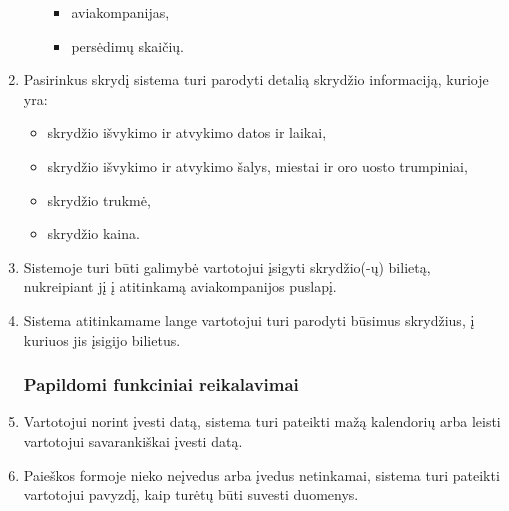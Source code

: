 \documentclass{VUMIFPSkursinis}
\begin{document}
\begin{enumerate}[label=\textbf{FR\arabic*}.]
\begin{enumerate}[label*=\textbf{\arabic*}.]
                        	\begin{itemize}
                            	\item aviakompanijas,
                            	\item persėdimų skaičių.
                        	\end{itemize}
                    	\end{enumerate}
                    	\item \label{skrydzio_info} Pasirinkus skrydį sistema turi parodyti detalią skrydžio informaciją, kurioje yra:
                    	\begin{itemize}
                    		\item skrydžio išvykimo ir atvykimo datos ir laikai,
                    		\item skrydžio išvykimo ir atvykimo šalys, miestai ir oro uosto trumpiniai,
							\item skrydžio trukmė,
							\item skrydžio kaina.
                    	\end{itemize}
                    	\item Sistemoje turi būti galimybė vartotojui įsigyti skrydžio(-ų) bilietą, nukreipiant jį į atitinkamą aviakompanijos puslapį.
                    	\item Sistema atitinkamame lange vartotojui turi parodyti būsimus skrydžius, į kuriuos jis įsigijo bilietus.
                	\subsubsection{Papildomi funkciniai reikalavimai}
                    	\item \label{datos_ivedimas} Vartotojui norint įvesti datą, sistema turi pateikti mažą kalendorių arba leisti vartotojui savarankiškai įvesti datą.
                    	\item Paieškos formoje nieko neįvedus arba įvedus netinkamai, sistema turi pateikti vartotojui pavyzdį, kaip turėtų būti suvesti duomenys.
                \end{enumerate}
\end{document}
